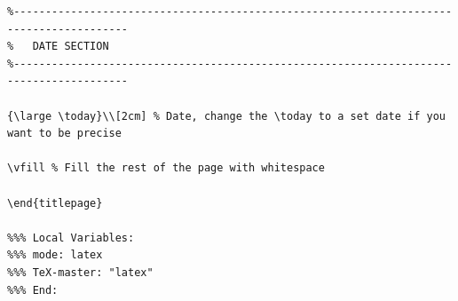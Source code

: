 \begin{lstlisting}
%----------------------------------------------------------------------------------------
%	DATE SECTION
%----------------------------------------------------------------------------------------

{\large \today}\\[2cm] % Date, change the \today to a set date if you want to be precise

\vfill % Fill the rest of the page with whitespace

\end{titlepage}

%%% Local Variables:
%%% mode: latex
%%% TeX-master: "latex"
%%% End:

\end{lstlisting}

